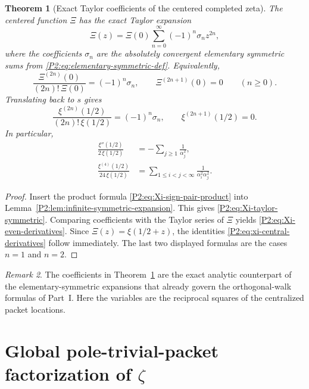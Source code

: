 \documentclass[11pt,a4paper]{article}
\numberwithin{equation}{section}
\newtheorem{theorem}{Theorem}[section]
\theoremstyle{definition}
\theoremstyle{remark}
\newtheorem{remark}[theorem]{Remark}
\begin{document}
\begin{theorem}[Exact Taylor coefficients of the centered completed zeta]\label{P2:thm:Xi-taylor-coefficients}
The centered function $\Xi$ has the exact Taylor expansion
\begin{equation}\label{P2:eq:Xi-taylor-symmetric}
\Xi(z)=\Xi(0)\sum_{n=0}^{\infty}(-1)^n\sigma_n z^{2n},
\end{equation}
where the coefficients $\sigma_n$ are the absolutely convergent elementary symmetric sums from \eqref{P2:eq:elementary-symmetric-def}.  Equivalently,
\begin{equation}\label{P2:eq:Xi-even-derivatives}
\frac{\Xi^{(2n)}(0)}{(2n)!\,\Xi(0)}=(-1)^n\sigma_n,
\qquad
\Xi^{(2n+1)}(0)=0
\qquad (n\ge 0).
\end{equation}
Translating back to $s$ gives
\begin{equation}\label{P2:eq:xi-central-derivatives}
\frac{\xi^{(2n)}(1/2)}{(2n)!\,\xi(1/2)}=(-1)^n\sigma_n,
\qquad
\xi^{(2n+1)}(1/2)=0.
\end{equation}
In particular,
\begin{align}
\frac{\xi''(1/2)}{2\,\xi(1/2)}&=-\sum_{j\ge 1}\frac{1}{\alpha_j^2},\label{P2:eq:xi-second-derivative}\\
\frac{\xi^{(4)}(1/2)}{24\,\xi(1/2)}&=\sum_{1\le i<j<\infty}\frac{1}{\alpha_i^2\alpha_j^2}.\label{P2:eq:xi-fourth-derivative}
\end{align}
\end{theorem}

\begin{proof}
Insert the product formula \eqref{P2:eq:Xi-sign-pair-product} into Lemma~\ref{P2:lem:infinite-symmetric-expansion}.  This gives \eqref{P2:eq:Xi-taylor-symmetric}.  Comparing coefficients with the Taylor series of $\Xi$ yields \eqref{P2:eq:Xi-even-derivatives}.  Since $\Xi(z)=\xi(1/2+z)$, the identities \eqref{P2:eq:xi-central-derivatives} follow immediately.  The last two displayed formulas are the cases $n=1$ and $n=2$.
\end{proof}

\begin{remark}
The coefficients in Theorem~\ref{P2:thm:Xi-taylor-coefficients} are the exact analytic counterpart of the elementary-symmetric expansions that already govern the orthogonal-walk formulas of Part~I.  Here the variables are the reciprocal squares of the centralized packet locations.
\end{remark}

\section{Global pole-trivial-packet factorization of $\zeta$}
\end{document}
